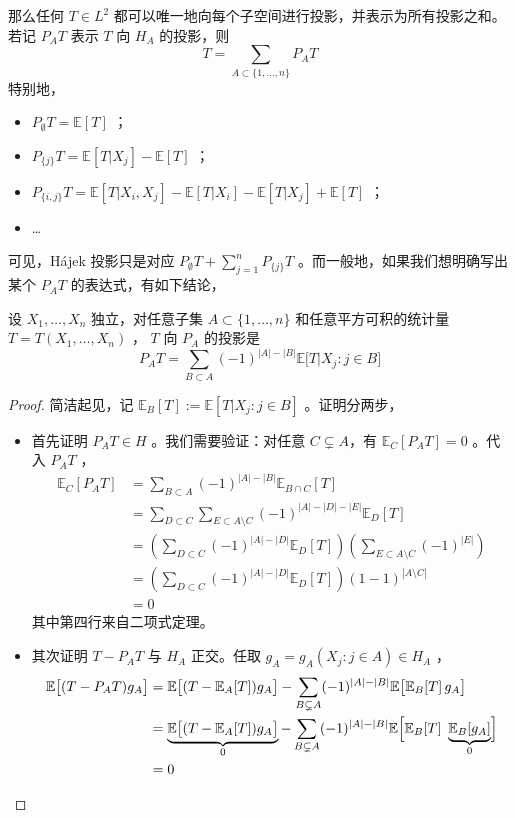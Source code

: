那么任何 $T\in L^2$ 都可以唯一地向每个子空间进行投影，并表示为所有投影之和。若记 $P_AT$ 表示 $T$ 向 $H_A$ 的投影，则
\[T=\sum_{A\subset\{1,\dots,n\}}P_AT\]
特别地，

\begin{itemize}
\tightlist
\item
  $P_\emptyset T=\mathbb E[T]$ ；
\item
  $P_{\{j\}}T=\mathbb E[T|X_j]-\mathbb E[T]$ ；
\item
  $P_{\{i,j\}}T=\mathbb E[T|X_i,X_j]-\mathbb E[T|X_i]-\mathbb E[T|X_j]+\mathbb E[T]$ ；
\item
  \ldots{}
\end{itemize}

可见，Hájek 投影只是对应 $\textstyle P_\emptyset T+\sum_{j=1}^nP_{\{j\}}T$ 。而一般地，如果我们想明确写出某个 $P_AT$ 的表达式，有如下结论，

\begin{lemma}[子集上的正交投影]\label{lem:ch10:subset-projection}

设 $X_1,\dots,X_n$ 独立，对任意子集 $A\subset\{1,\dots,n\}$ 和任意平方可积的统计量 $T=T(X_1,\dots,X_n)$ ， $T$ 向 $P_A$ 的投影是
\[P_AT=\sum_{B\subset A}(-1)^{|A|-|B|}\mathbb E\big[T\big|X_j:j\in B\big]\]
\end{lemma}

\begin{proof}

简洁起见，记 $\mathbb E_B[T]:=\mathbb E[T|X_j:j\in B]$ 。证明分两步，

\begin{itemize}
\tightlist
\item
  首先证明 $P_AT\in H$ 。我们需要验证：对任意 $C \subsetneq A$，有 $\mathbb E_C[P_AT]=0$ 。代入 $P_AT$ ，
\[\begin{aligned} \mathbb E_C[P_AT]&= \sum_{B\subset A} (-1)^{|A|-|B|} \mathbb E_{B\cap C} [T]\\ &=\sum_{D\subset C}\sum_{E\subset A\setminus C}(-1)^{|A|-|D|-|E|}\mathbb E_D[T]\\ &=\left(\sum_{D\subset C}(-1)^{|A|-|D|}\mathbb E_D[T]\right)\left(\sum_{E\subset A\setminus C}(-1)^{|E|}\right)\\ &=\left(\sum_{D\subset C}(-1)^{|A|-|D|}\mathbb E_D[T]\right)(1-1)^{|A\setminus C|}\\ &=0 \end{aligned}\]
其中第四行来自二项式定理。

\item
  其次证明 $T-P_AT$ 与 $H_A$ 正交。任取 $g_A=g_A(X_j:j\in A)\in H_A$ ，
\[\begin{aligned} \mathbb{E}\bigl[(T-P_A T)g_A\bigr] &= \mathbb{E}\bigl[(T-\mathbb{E}_A[T])g_A\bigr] - \sum_{B\subsetneq A} (-1)^{|A|-|B|} \mathbb{E}\bigl[\mathbb{E}_B[T] \, g_A\bigr] \\ &= \underbrace{\mathbb{E}\bigl[(T-\mathbb{E}_A[T])g_A\bigr]}_0 - \sum_{B\subsetneq A} (-1)^{|A|-|B|} \mathbb{E}\Bigl[\mathbb{E}_B[T] \  \underbrace{\mathbb{E}_B[g_A]}_{0}\Bigr] \\ &= 0 \end{aligned}\]
\end{itemize}

\end{proof}

